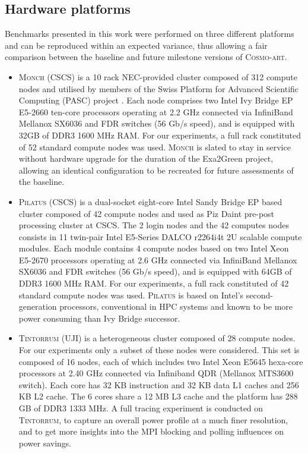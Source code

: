 \subsection{Hardware platforms}
\label{subsec:3.1}

Benchmarks presented  in this work  were performed on  three different
platforms  and can  be reproduced  within an  expected  variance, thus
allowing a  fair comparison between the baseline  and future milestone
versions of \textsc{Cosmo-art}.

\begin{itemize}
\item \textsc{Monch (CSCS)} is a 10 rack NEC-provided cluster composed
  of 312 compute  nodes and utilised by members  of the Swiss Platform
  for Advanced Scientific  Computing (PASC) project \citep{PASC}. Each
  node comprises  two Intel Ivy Bridge EP  E5-2660 ten-core processors
  operating at  2.2 GHz connected  via InfiniBand Mellanox  SX6036 and
  FDR switches (56 Gb/s speed), and is equipped with 32GB of DDR3 1600
  MHz  RAM.   For our  experiments,  a  full  rack constituted  of  52
  standard compute  nodes was used.  \textsc{Monch} is  slated to stay
  in  service  without  hardware  upgrade  for  the  duration  of  the
  Exa2Green  project,  allowing   an  identical  configuration  to  be
  recreated for future assessments of the baseline.\\

\item \textsc{Pilatus (CSCS)} is  a dual-socket eight-core Intel Sandy
  Bridge EP based cluster composed of 42 compute nodes and used as Piz
  Daint pre-post  processing cluster at  CSCS.  The 2 login  nodes and
  the 42 computes nodes consists in 11 twin-pair Intel E5-Series DALCO
  r2264i4t 2U scalable compute modules. Each module contains 4 compute
  nodes based  on two Intel  Xeon E5-2670 processors operating  at 2.6
  GHz connected  via InfiniBand Mellanox  SX6036 and FDR  switches (56
  Gb/s speed), and is equipped with 64GB of DDR3 1600 MHz RAM. For our
  experiments, a  full rack constituted  of 42 standard  compute nodes
  was  used. \textsc{Pilatus}  is based  on  Intel's second-generation
  processors, conventional in  HPC systems and known to  be more power
  consuming than Ivy Bridge successor.\\

\item \textsc{Tintorrum (UJI)} is  a heterogeneous cluster composed of
  28 compute nodes.  For our  experiments only a subset of these nodes
  were considered.   This set is composed  of 16 nodes,  each of which
  includes  two Intel  Xeon  E5645 hexa-core  processors  at 2.40  GHz
  connected via  Infiniband QDR (Mellanox MTS3600  switch).  Each core
  has  32 KB  instruction  and 32  KB data  L1  caches and  256 KB  L2
  cache. The 6 cores  share a 12 MB L3 cache and  the platform has 288
  GB  of DDR3 1333  MHz.  A  full tracing  experiment is  conducted on
  \textsc{Tintorrum}, to  capture an overall  power profile at  a much
  finer resolution, and to get more insights into the MPI blocking and
  polling influences on power savings.
\end{itemize}

